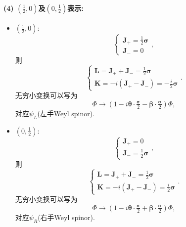 \paragraph*{(4) $(\frac{1}{2}, 0)$及$(0, \frac{1}{2})$表示: }
\begin{itemize}
  \item $(\frac{1}{2}, 0)$:
        \begin{equation}
          \left\{\begin{array}{l}
            \mathbf{J}_+ = \tfrac{1}{2}\bm{\sigma} \\
            \mathbf{J}_- = 0
          \end{array} \right.,
        \end{equation}
        则
        \begin{equation}
          \left\{\begin{array}{l}
            \mathbf{L} = \mathbf{J}_+ + \mathbf{J}_- = \frac{1}{2}\bm{\sigma} \\
            \mathbf{K} = -i(\mathbf{J}_+ - \mathbf{J}_-) = -\frac{i}{2}\bm{\sigma}
          \end{array} \right..
        \end{equation}
        无穷小变换可以写为
        \begin{equation}
          \Phi \rightarrow (1 - i\bm{\theta}\cdot\tfrac{\bm{\sigma}}{2} - \bm{\beta}\cdot\tfrac{\bm{\sigma}}{2})\Phi,
        \end{equation}
        对应$\psi_L$(左手Weyl spinor).
  \item $(0, \frac{1}{2})$:
        \begin{equation}
          \left\{\begin{array}{l}
            \mathbf{J}_+ = 0 \\
            \mathbf{J}_- = \tfrac{1}{2}\bm{\sigma}
          \end{array} \right.,
        \end{equation}
        则
        \begin{equation}
          \left\{\begin{array}{l}
            \mathbf{L} = \mathbf{J}_+ + \mathbf{J}_- = \frac{1}{2}\bm{\sigma} \\
            \mathbf{K} = -i(\mathbf{J}_+ - \mathbf{J}_-) = \frac{i}{2}\bm{\sigma}
          \end{array} \right..
        \end{equation}
        无穷小变换可以写为
        \begin{equation}
          \Phi \rightarrow (1 - i\bm{\theta}\cdot\tfrac{\bm{\sigma}}{2} + \bm{\beta}\cdot\tfrac{\bm{\sigma}}{2})\Phi,
        \end{equation}
        对应$\psi_R$(右手Weyl spinor).
\end{itemize}

